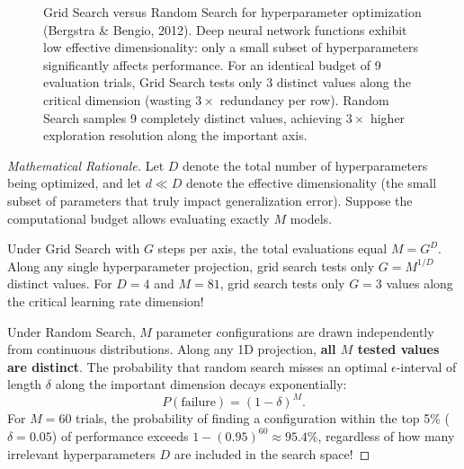 \begin{figure}[H]
\caption{Grid Search versus Random Search for hyperparameter optimization (Bergstra \& Bengio, 2012). Deep neural network functions exhibit low effective dimensionality: only a small subset of hyperparameters significantly affects performance. For an identical budget of 9 evaluation trials, Grid Search tests only 3 distinct values along the critical dimension (wasting $3\times$ redundancy per row). Random Search samples 9 completely distinct values, achieving $3\times$ higher exploration resolution along the important axis.}
\label{fig:grid_vs_random_search}
\end{figure}

\begin{proof}[Mathematical Rationale]
Let $D$ denote the total number of hyperparameters being optimized, and let $d \ll D$ denote the effective dimensionality (the small subset of parameters that truly impact generalization error). Suppose the computational budget allows evaluating exactly $M$ models.

Under Grid Search with $G$ steps per axis, the total evaluations equal $M = G^D$. Along any single hyperparameter projection, grid search tests only $G = M^{1/D}$ distinct values. For $D = 4$ and $M = 81$, grid search tests only $G = 3$ values along the critical learning rate dimension!

Under Random Search, $M$ parameter configurations are drawn independently from continuous distributions. Along any 1D projection, \textbf{all $M$ tested values are distinct}. The probability that random search misses an optimal $\epsilon$-interval of length $\delta$ along the important dimension decays exponentially:
\begin{equation}
P(\text{failure}) = (1 - \delta)^M.
\end{equation}
For $M = 60$ trials, the probability of finding a configuration within the top 5\% ($\delta = 0.05$) of performance exceeds $1 - (0.95)^{60} \approx 95.4\%$, regardless of how many irrelevant hyperparameters $D$ are included in the search space!
\end{proof}

